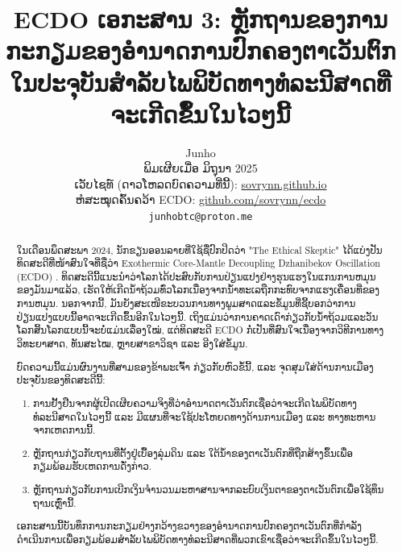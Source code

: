 \documentclass[10pt,twocolumn,letterpaper]{article}
\begin{document}
\title{ECDO ເອກະສານ 3: ຫຼັກຖານຂອງການກະກຽມຂອງອຳນາດການປົກຄອງຕາເວັນຕົກໃນປະຈຸບັນສຳລັບໄພພິບັດທາງທໍລະນີສາດທີ່ຈະເກີດຂຶ້ນໃນໄວໆນີ້}

\author{Junho\\
ພິມເຜີຍເມື່ອ ມິຖຸນາ 2025\\
ເວັບໄຊທ໌ (ດາວໂຫລດບົດຄວາມທີ່ນີ້): \href{https://sovrynn.github.io}{sovrynn.github.io}\\
ຫໍສະໝຸດຄົ້ນຄວ້າ ECDO: \href{https://github.com/sovrynn/ecdo}{github.com/sovrynn/ecdo}\\
{\tt\small junhobtc@proton.me}
}
\maketitle

\begin{abstract}
ໃນເດືອນພຶດສະພາ 2024, ນັກຂຽນອອນລາຍທີ່ໃຊ້ຊື່ປົກປິດວ່າ "The Ethical Skeptic" \cite{0} ໄດ້ແບ່ງປັນທິດສະດີທີ່ໜ້າສົນໃຈທີ່ຊື່ວ່າ Exothermic Core-Mantle Decoupling Dzhanibekov Oscillation (ECDO) \cite{1}. ທິດສະດີນີ້ແນະນຳວ່າໂລກໄດ້ປະສົບກັບການປ່ຽນແປງຢ່າງຮຸນແຮງໃນແກນການຫມຸນຂອງມັນມາແລ້ວ, ເຮັດໃຫ້ເກີດນໍ້າຖ້ວມທົ່ວໂລກເນື່ອງຈາກນໍ້າທະເລຖືກກະທົບຈາກແຮງເຄື່ອນທີ່ຂອງການຫມຸນ. ນອກຈາກນີ້, ມັນຍັງສະເໜີຂະບວນການທາງພູມສາດແລະຂໍ້ມູນທີ່ຊີ້ບອກວ່າການປ່ຽນແປງແບບນີ້ອາດຈະເກີດຂຶ້ນອີກໃນໄວໆນີ້. ເຖິງແມ່ນວ່າການຄາດເດົາກ່ຽວກັບນໍ້າຖ້ວມແລະວັນໂລກສິ້ນໂລກແບບນີ້ຈະບໍ່ແມ່ນເລື່ອງໃໝ່, ແຕ່ທິດສະດີ ECDO ກໍ່ເປັນທີ່ສົນໃຈເນື່ອງຈາກວິທີການທາງວິທະຍາສາດ, ທັນສະໄໝ, ຫຼາຍສາຂາວິຊາ ແລະ ອີງໃສ່ຂໍ້ມູນ.

ບົດຄວາມນີ້ແມ່ນຜົນງານທີ່ສາມຂອງຂ້າພະເຈົ້າ \cite{2,3} ກ່ຽວກັບຫົວຂໍ້ນີ້, ແລະ ຈຸດສຸມໃສ່ດ້ານການເມືອງປະຈຸບັນຂອງທິດສະດີນີ້:
\begin{flushleft}
\begin{enumerate}
    \item ການຢັ້ງຢືນຈາກຜູ້ເປີດເຜີຍຄວາມຈິງທີ່ວ່າອຳນາດຕາເວັນຕົກເຊື່ອວ່າຈະເກີດໄພພິບັດທາງທໍລະນີສາດໃນໄວໆນີ້ ແລະ ມີແຜນທີ່ຈະໃຊ້ປະໂຫຍດທາງດ້ານການເມືອງ ແລະ ທາງທະຫານຈາກເຫດການນີ້.
    \item ຫຼັກຖານກ່ຽວກັບຖານທີ່ຕັ້ງຢູ່ເບື້ອງລຸ່ມດິນ ແລະ ໃຕ້ນ້ຳຂອງຕາເວັນຕົກທີ່ຖືກສ້າງຂຶ້ນເພື່ອກຽມພ້ອມຮັບເຫດການດັ່ງກ່າວ.
    \item ຫຼັກຖານກ່ຽວກັບການເບີກເງິນຈຳນວນມະຫາສານຈາກລະບົບເງິນຕາຂອງຕາເວັນຕົກເພື່ອໃຊ້ທຶນຖານເຫຼົ່ານີ້.
\end{enumerate}
\end{flushleft}
ເອກະສານນີ້ບັນທຶກການກະກຽມຢ່າງກວ້າງຂວາງຂອງອຳນາດການປົກຄອງຕາເວັນຕົກທີ່ກຳລັງດຳເນີນການເພື່ອກຽມພ້ອມສຳລັບໄພພິບັດທາງທໍລະນີສາດທີ່ພວກເຂົາເຊື່ອວ່າຈະເກີດຂຶ້ນໃນໄວໆນີ້.
\end{abstract}
\end{document}
